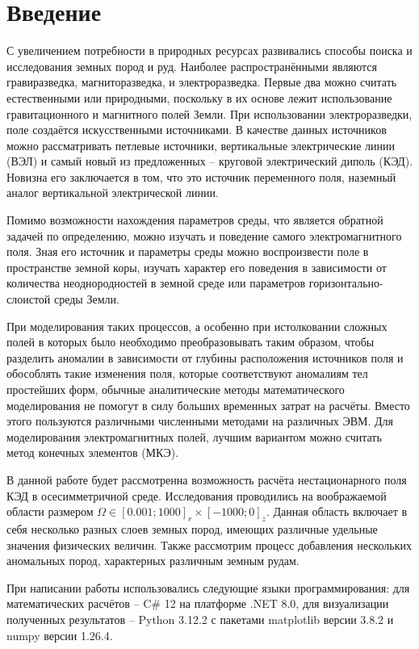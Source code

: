 \chapter*{Введение}


С увеличением потребности в природных ресурсах развивались способы поиска и исследования земных пород и руд. Наиболее распространёнными являются гравиразведка, магниторазведка, и электроразведка. Первые два можно считать естественными или природными, поскольку в их основе лежит использование гравитационного и магнитного полей Земли. При использовании электроразведки, поле создаётся искусственными источниками. В качестве данных источников можно рассматривать петлевые источники, вертикальные электрические линии (ВЭЛ) и самый новый из предложенных -- круговой электрический диполь (КЭД). Новизна его заключается в том, что это источник переменного поля, наземный аналог вертикальной электрической линии. 

Помимо возможности нахождения параметров среды, что является обратной задачей по определению, можно изучать и поведение самого электромагнитного поля. Зная его источник и параметры среды можно воспроизвести поле в пространстве земной коры, изучать характер его поведения в зависимости от количества неоднородностей в земной среде или параметров горизонтально-слоистой среды Земли.

При моделирования таких процессов, а особенно при истолковании сложных полей в которых было необходимо преобразовывать таким образом, чтобы разделить аномалии в зависимости от глубины расположения источников поля и обособлять такие изменения поля, которые соответствуют аномалиям тел простейших форм, обычные аналитические методы математического моделирования не помогут в силу больших временных затрат на расчёты. Вместо этого пользуются различными численными методами на различных ЭВМ. Для моделирования электромагнитных полей, лучшим вариантом можно считать метод конечных элементов (МКЭ). 

В данной работе будет рассмотренна возможность расчёта нестационарного поля КЭД в осесимметричной среде. Исследования проводились на воображаемой области размером $\Omega \in [0.001; 1000]_r \times [-1000; 0]_z$. Данная область включает в себя несколько разных слоев земных пород, имеющих различные удельные значения физических величин. Также рассмотрим процесс добавления нескольких аномальных пород, характерных различным земным рудам.

При написании работы использовались следующие языки программирования: для математических расчётов -- C$\#$ 12 на платформе .NET 8.0, для визуализации полученных результатов -- Python 3.12.2 с пакетами matplotlib версии 3.8.2 и numpy версии 1.26.4. 
